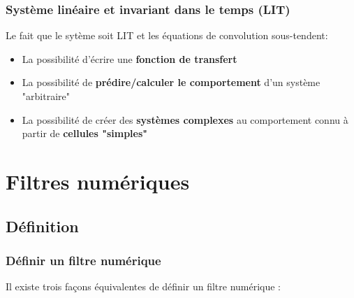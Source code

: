 \documentclass{beamer}
\begin{document}
\begin{frame}
\frametitle{Système linéaire et invariant dans le temps (LIT)}
Le fait que le sytème soit LIT et les équations de convolution sous-tendent: \\
\vspace{1cm}
\begin{itemize}
\item La possibilité d'écrire une \textbf{fonction de transfert}
\vspace{0.3cm}
\item La possibilité de \textbf{prédire/calculer le comportement} d'un système "arbitraire"
\vspace{0.3cm}
\item La possibilité de créer des \textbf{systèmes complexes} au comportement connu à partir de \textbf{cellules "simples"}
\end{itemize}

\end{frame} 

\section{Filtres numériques}
\subsection{Définition}
\begin{frame}
\frametitle{Définir un filtre numérique}
Il existe trois façons équivalentes de définir un filtre numérique :\\
\vspace{0.5cm}
\begin{columns}[T]
\column{40mm}
\column{40mm}
\column{40mm}
\end{columns}
\end{frame}
\end{document}
